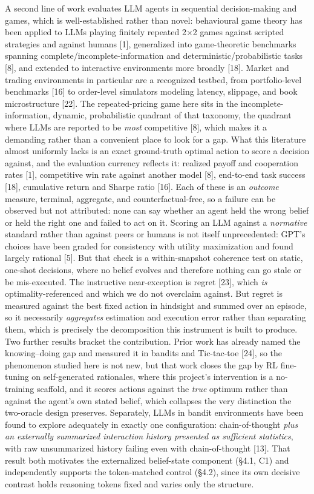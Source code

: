 \documentclass[
  11pt,
]{article}
\newcounter{none} %
\begin{document}
A second line of work evaluates LLM agents in sequential decision-making and games, which is well-established rather than novel: behavioural game theory has been applied to LLMs playing finitely repeated 2×2 games against scripted strategies and against humans {[}1{]}, generalized into game-theoretic benchmarks spanning complete/incomplete-information and deterministic/probabilistic tasks {[}8{]}, and extended to interactive environments more broadly {[}18{]}. Market and trading environments in particular are a recognized testbed, from portfolio-level benchmarks {[}16{]} to order-level simulators modeling latency, slippage, and book microstructure {[}22{]}. The repeated-pricing game here sits in the incomplete-information, dynamic, probabilistic quadrant of that taxonomy, the quadrant where LLMs are reported to be \emph{most} competitive {[}8{]}, which makes it a demanding rather than a convenient place to look for a gap. What this literature almost uniformly lacks is an exact ground-truth optimal action to score a decision against, and the evaluation currency reflects it: realized payoff and cooperation rates {[}1{]}, competitive win rate against another model {[}8{]}, end-to-end task success {[}18{]}, cumulative return and Sharpe ratio {[}16{]}. Each of these is an \emph{outcome} measure, terminal, aggregate, and counterfactual-free, so a failure can be observed but not attributed: none can say whether an agent held the wrong belief or held the right one and failed to act on it. Scoring an LLM against a \emph{normative} standard rather than against peers or humans is not itself unprecedented: GPT's choices have been graded for consistency with utility maximization and found largely rational {[}5{]}. But that check is a within-snapshot coherence test on static, one-shot decisions, where no belief evolves and therefore nothing can go stale or be mis-executed. The instructive near-exception is regret {[}23{]}, which \emph{is} optimality-referenced and which we do not overclaim against. But regret is measured against the best fixed action in hindsight and summed over an episode, so it necessarily \emph{aggregates} estimation and execution error rather than separating them, which is precisely the decomposition this instrument is built to produce. Two further results bracket the contribution. Prior work has already named the knowing--doing gap and measured it in bandits and Tic-tac-toe {[}24{]}, so the phenomenon studied here is not new, but that work closes the gap by RL fine-tuning on self-generated rationales, where this project's intervention is a no-training scaffold, and it scores actions against the \emph{true} optimum rather than against the agent's own stated belief, which collapses the very distinction the two-oracle design preserves. Separately, LLMs in bandit environments have been found to explore adequately in exactly one configuration: chain-of-thought \emph{plus an externally summarized interaction history presented as sufficient statistics}, with raw unsummarized history failing even with chain-of-thought {[}13{]}. That result both motivates the externalized belief-state component (§4.1, C1) and independently supports the token-matched control (§4.2), since its own decisive contrast holds reasoning tokens fixed and varies only the structure.
\end{document}

